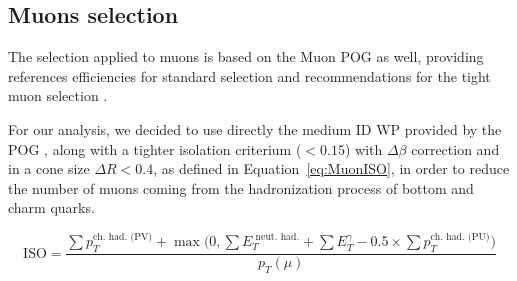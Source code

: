 \documentclass[a4paper, 10pt, openright]{report}
\begin{document}
%
%

\subsection{Muons selection} \label{section:MuSel}

The selection applied to muons is based on the Muon \ac{POG} as well, providing references efficiencies for standard selection and recommendations for the tight muon selection \cite{MuonPOG}.

For our analysis, we decided to use directly the medium ID \ac{WP} provided by the \ac{POG} \cite{MuonWPs}, along with a tighter isolation criterium ($< 0.15$) with $\Delta \beta$ correction and in a cone size $\Delta R < 0.4$, as defined in Equation~\ref{eq:MuonISO}, in order to reduce the number of muons coming from the hadronization process of bottom and charm quarks.

\begin{equation}
\label{eq:MuonISO}
\text{ISO} = \frac{\sum p_T^{\text{ch. had. (PV)}} + \max \big (0, \sum E_T^{\text{ neut. had.}} + \sum E_T^{\gamma}  - 0.5 \times \sum p_T^\text{ch. had. (PU)} \big )}{p_T(\mu)}
\end{equation}
\end{document}
